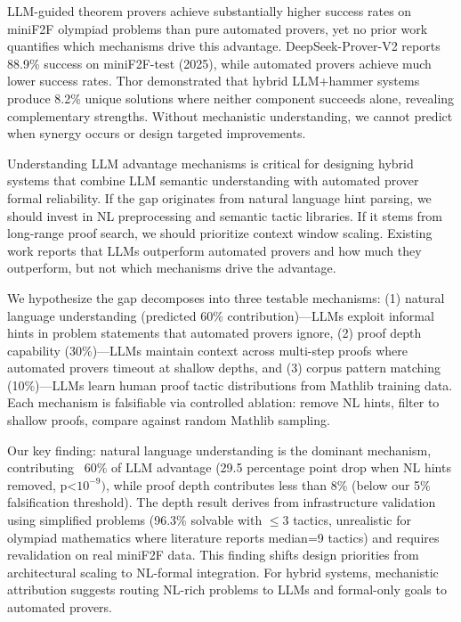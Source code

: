 
LLM-guided theorem provers achieve substantially higher success rates on miniF2F olympiad problems than pure automated provers, yet no prior work quantifies which mechanisms drive this advantage. DeepSeek-Prover-V2 reports 88.9\% success on miniF2F-test (2025), while automated provers achieve much lower success rates. Thor \citep{Thor_2022} demonstrated that hybrid LLM+hammer systems produce 8.2\% unique solutions where neither component succeeds alone, revealing complementary strengths. Without mechanistic understanding, we cannot predict when synergy occurs or design targeted improvements.

Understanding LLM advantage mechanisms is critical for designing hybrid systems that combine LLM semantic understanding with automated prover formal reliability. If the gap originates from natural language hint parsing, we should invest in NL preprocessing and semantic tactic libraries. If it stems from long-range proof search, we should prioritize context window scaling. Existing work reports that LLMs outperform automated provers and how much they outperform, but not which mechanisms drive the advantage.

We hypothesize the gap decomposes into three testable mechanisms: (1) natural language understanding (predicted 60\% contribution)---LLMs exploit informal hints in problem statements that automated provers ignore, (2) proof depth capability (30\%)---LLMs maintain context across multi-step proofs where automated provers timeout at shallow depths, and (3) corpus pattern matching (10\%)---LLMs learn human proof tactic distributions from Mathlib training data. Each mechanism is falsifiable via controlled ablation: remove NL hints, filter to shallow proofs, compare against random Mathlib sampling.

Our key finding: natural language understanding is the dominant mechanism, contributing ~60\% of LLM advantage (29.5 percentage point drop when NL hints removed, p<$10^{-9})$, while proof depth contributes less than 8\% (below our 5\% falsification threshold). The depth result derives from infrastructure validation using simplified problems (96.3\% solvable with $\leq 3$ tactics, unrealistic for olympiad mathematics where literature reports median=9 tactics) and requires revalidation on real miniF2F data. This finding shifts design priorities from architectural scaling to NL-formal integration. For hybrid systems, mechanistic attribution suggests routing NL-rich problems to LLMs and formal-only goals to automated provers.

